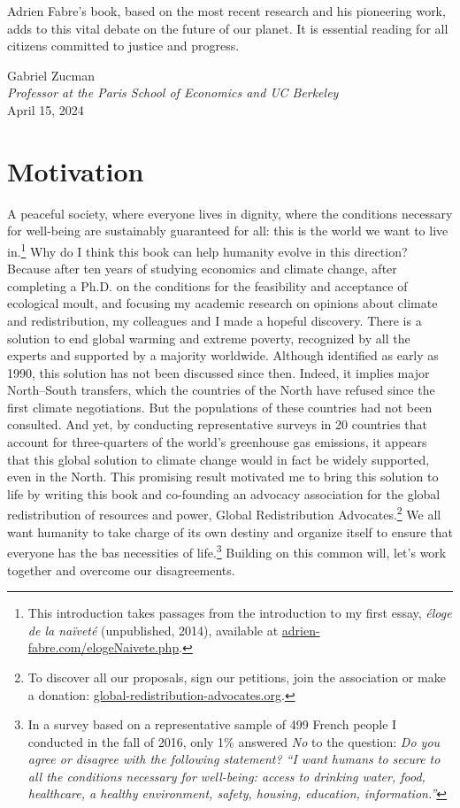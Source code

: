 \documentclass[a5paper,english,openany]{memoir}
\begin{document}
Adrien Fabre's book, based on the most recent research and his pioneering work, adds to this vital debate on the future of our planet. It is essential reading for all citizens committed to justice and progress.

\begin{flushright}
Gabriel Zucman\\
\textit{Professor at the Paris School of Economics and UC Berkeley}\\
April 15, 2024
\end{flushright}

\chapter*{Motivation}{\label{ch:intro}}


A peaceful society, where everyone lives in dignity, where the conditions necessary for well-being are sustainably guaranteed for all: this is the world we want to live in.\footnote{This introduction takes passages from the introduction to my first essay, \textit{éloge de la naïveté} (unpublished, 2014), available at \href{https://adrien-fabre.com/elogeNaivete.php}{adrien-fabre.com/elogeNaivete.php}.} Why do I think this book can help humanity evolve in this direction? Because after ten years of studying economics and climate change, after completing a Ph.D. on the conditions for the feasibility and acceptance of ecological moult, and focusing my academic research on opinions about climate and redistribution, my colleagues and I made a hopeful discovery. %
There is a solution to end global warming and extreme poverty, recognized by all the experts and supported by a majority worldwide. 
Although identified as early as 1990, this solution has not been discussed 
since then. Indeed, it implies major North--South transfers, which the countries of the North have refused since the first climate negotiations. But the populations of these countries had not been consulted. And yet, by conducting representative surveys in 20 countries that account for three-quarters of the world's greenhouse gas emissions, it appears that this global solution to climate change would in fact be widely supported, even in the North. 
This promising result motivated me to bring this solution to life by writing this book and co-founding an advocacy association for the global redistribution of resources and power, Global Redistribution Advocates.\footnote{To discover all our proposals, sign our petitions, join the association or make a donation: \href{http://global-redistribution-advocates.org/}{global-redistribution-advocates.org}.} %
We all want humanity to take charge of its own destiny and organize itself to ensure that everyone has the bas necessities of life.\footnote{In a survey based on a representative sample of 499 
French people I conducted in the fall of 2016, only 1\% answered \textit{No} to the question: \textit{Do you agree or disagree with the following statement? ``I want humans to secure to all the conditions necessary for well-being: access to drinking water, food, healthcare, a healthy environment, safety, housing, education, information.''}} 
Building on this common will, let's work together and overcome our disagreements.
\end{document}
